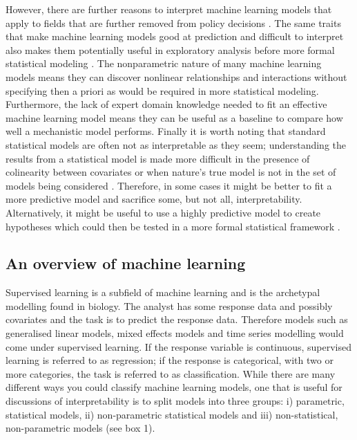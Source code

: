 \documentclass[10pt,]{article}
\begin{document}
However, there are further reasons to interpret machine learning models that apply to fields that are further removed from policy decisions \citep{elith2009species}.
The same traits that make machine learning models good at prediction and difficult to interpret also makes them potentially useful in exploratory analysis before more formal statistical modeling \citep{zhao2017causal}.
The nonparametric nature of many machine learning models means they can discover nonlinear relationships and interactions without specifying then a priori as would be required in more statistical modeling.
Furthermore, the lack of expert domain knowledge needed to fit an effective machine learning model means they can be useful as a baseline to compare how well a mechanistic model performs.
Finally it is worth noting that standard statistical models are often not as interpretable as they seem; understanding the results from a statistical model is made more difficult in the presence of colinearity between covariates or when nature's true model is not in the set of models being considered \citep{lyddon2018nonparametric, yao2017using}.
Therefore, in some cases it might be better to fit a more predictive model and sacrifice some, but not all, interpretability.
Alternatively, it might be useful to use a highly predictive model to create hypotheses which could then be tested in a more formal statistical framework \citep{zhao2017causal}.

\subsection{An overview of machine learning}\label{an-overview-of-machine-learning}

Supervised learning is a subfield of machine learning and is the archetypal modelling found in biology.
The analyst has some response data and possibly covariates and the task is to predict the response data.
Therefore models such as generalised linear models, mixed effects models and time series modelling would come under supervised learning.
If the response variable is continuous, supervised learning is referred to as regression; if the response is categorical, with two or more categories, the task is referred to as classification.
While there are many different ways you could classify machine learning models, one that is useful for discussions of interpretability is to split models into three groups: i) parametric, statistical models, ii) non-parametric statistical models and iii) non-statistical, non-parametric models (see box 1).
\end{document}
